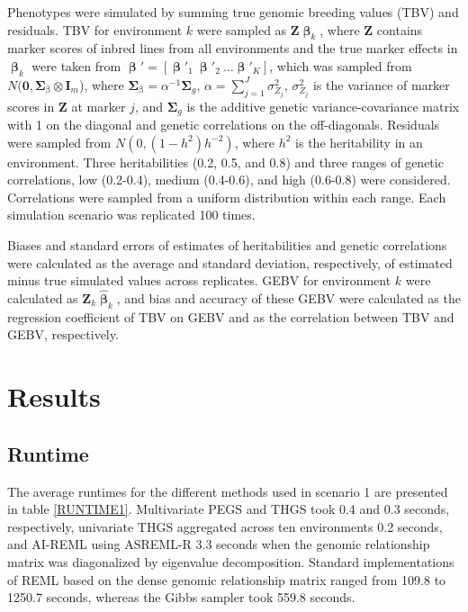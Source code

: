 \documentclass{bmcart}
\begin{document}
 Phenotypes were simulated by summing true genomic breeding values (TBV) and residuals. TBV for environment $k$ were sampled as $\mathbf{Z}\mathbf{\upbeta}_k$, where $\mathbf{Z}$ contains marker scores of inbred lines from all environments and the true marker effects in $\mathbf{\upbeta}_k$ were taken from $\mathbf{\upbeta}' = [\mathbf{\upbeta}'_1 ~ \mathbf{\upbeta}'_2 ~ \hdots \mathbf{\upbeta}'_K]$, which was sampled from $N(\mathbf{0}, \mathbf{\Sigma}_{\upbeta}\otimes \mathbf{I}_m$), where $\mathbf{\Sigma}_{\upbeta} = 
 \alpha^{-1}\mathbf{\Sigma}_{g}$, $\alpha = \sum^J_{j=1}{\sigma^2_{Z_j}}$,  $\sigma^2_{Z_j}$ is the variance of marker scores in $\mathbf{Z}$ at marker $j$, and $\mathbf{\Sigma}_{g}$ is the additive genetic variance-covariance matrix with 1 on the diagonal and genetic correlations on the off-diagonals. Residuals were sampled from $N(0,(1-h^2)h^{-2})$, where $h^2$ is the heritability in an environment. Three heritabilities  (0.2, 0.5, and 0.8) and three ranges of genetic correlations, low (0.2-0.4), medium (0.4-0.6), and high (0.6-0.8) were considered. Correlations were sampled from a uniform distribution within each range. Each simulation scenario was replicated 100 times.

Biases and standard errors of estimates of heritabilities and genetic correlations were calculated as the average and standard deviation, respectively, of estimated minus true simulated values across replicates. GEBV for environment $k$ were calculated as $\mathbf{Z}_k\hat{\mathbf{\upbeta}}_k$, and bias and accuracy of these GEBV were calculated as the regression coefficient of TBV on GEBV and as the correlation between TBV and GEBV, respectively.

\section{Results}

\subsection{Runtime}

The average runtimes for the different methods used in scenario 1 are presented in table \ref{RUNTIME1}. Multivariate PEGS and THGS took 0.4 and 0.3 seconds, respectively, univariate THGS aggregated across ten environments 0.2 seconds, and AI-REML using ASREML-R 3.3 seconds when the genomic relationship matrix was diagonalized by  eigenvalue decomposition. Standard implementations of REML based on the dense genomic relationship matrix ranged from 109.8 to 1250.7 seconds, whereas the Gibbs sampler took 559.8 seconds.
\end{document}

